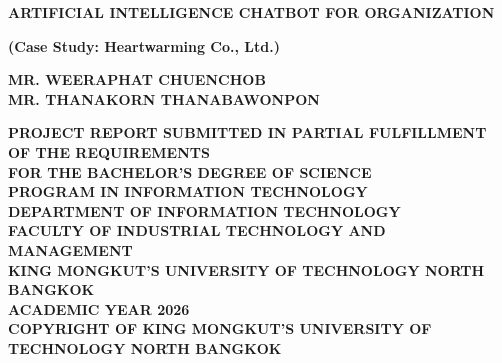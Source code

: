 \newpage
\thispagestyle{empty}
\begin{center}

\vspace*{-0.5in}

{\bf
    ARTIFICIAL INTELLIGENCE CHATBOT FOR ORGANIZATION
}

\vspace{0.2in}
{\bf
    (Case Study: Heartwarming Co., Ltd.)
}

\vspace{70mm}
\bf
MR. WEERAPHAT CHUENCHOB\\        %
MR. THANAKORN THANABAWONPON        %
\vspace{70mm}  

\vspace{0.2in}

{\bf
    PROJECT REPORT SUBMITTED IN PARTIAL FULFILLMENT OF THE REQUIREMENTS\\
    FOR THE BACHELOR’S DEGREE OF SCIENCE\\
    PROGRAM IN INFORMATION TECHNOLOGY\\
    DEPARTMENT OF INFORMATION TECHNOLOGY\\
    FACULTY OF INDUSTRIAL TECHNOLOGY AND MANAGEMENT\\
    KING MONGKUT’S UNIVERSITY OF TECHNOLOGY NORTH BANGKOK\\
    ACADEMIC YEAR 2026\\
    COPYRIGHT OF KING MONGKUT’S UNIVERSITY OF TECHNOLOGY NORTH BANGKOK
}

\end{center}
